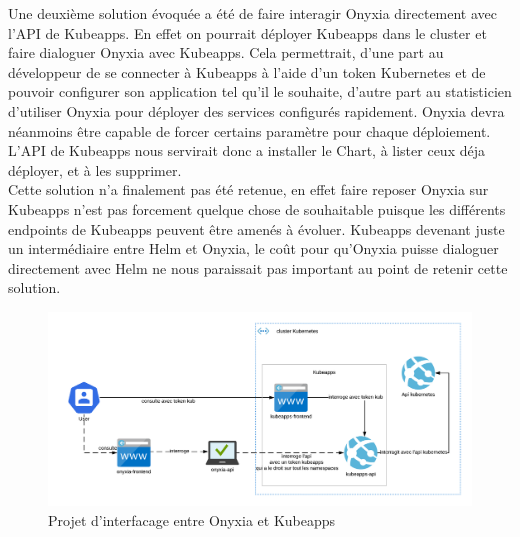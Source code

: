 \documentclass[11pt,fleqn]{book} %
\begin{document}
Une deuxième solution évoquée a été de faire interagir Onyxia directement avec l'API de Kubeapps. En effet on pourrait déployer Kubeapps dans le cluster et faire dialoguer Onyxia avec Kubeapps. Cela permettrait, d'une part au développeur de se connecter à Kubeapps à l'aide d'un token Kubernetes et de pouvoir configurer son application tel qu'il le souhaite, d'autre part au statisticien d'utiliser Onyxia pour déployer des services configurés rapidement. Onyxia devra néanmoins être capable de forcer certains paramètre pour chaque déploiement. L'API de Kubeapps nous servirait donc a installer le Chart, à lister ceux déja déployer, et à les supprimer. \\

Cette solution n'a finalement pas été retenue, en effet faire reposer Onyxia sur Kubeapps n'est pas forcement quelque chose de souhaitable puisque les différents endpoints de Kubeapps peuvent être amenés à évoluer. Kubeapps devenant juste un intermédiaire entre Helm et Onyxia, le coût pour qu'Onyxia  puisse dialoguer directement avec Helm ne nous paraissait pas important au point de retenir cette solution.\newpage

\begin{figure}[H]\centering
\renewcommand{\figurename}{Schéma}
\includegraphics[angle=90, scale=1]{Pictures/onyxia/Kubeapps.png}
\captionsetup{margin=1.5cm,format=hang,justification=justified}
\caption[]{Projet d'interfacage entre Onyxia et Kubeapps \newline}
\end{figure}





\end{document}
